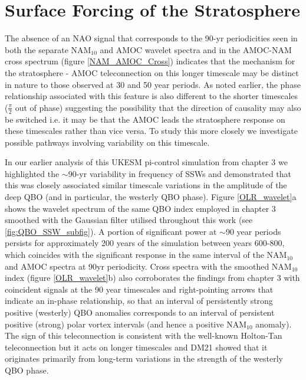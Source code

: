 \section{Surface Forcing of the Stratosphere}\label{surface-strat_forcing}
The absence of an NAO signal that corresponds to the 90-yr periodicities seen in both the separate NAM$_{10}$ and AMOC wavelet spectra and in the  AMOC-NAM cross spectrum (figure \ref{NAM_AMOC_Cross}) indicates that the mechanism for the stratosphere - AMOC teleconnection on this longer timescale may be distinct in nature to those observed at 30 and 50 year periods. As noted earlier, the phase relationship associated with this feature is also different to the shorter timescales ($\frac{\pi}{2}$ out of phase) suggesting the possibility that the direction of causality may also be switched i.e. it may be that the AMOC leads the stratosphere response on these timescales rather than vice versa. To study this more closely we investigate possible pathways involving variability on this timescale.

In our earlier analysis of this UKESM pi-control simulation from chapter 3 we highlighted the $\sim$90-yr variability in frequency of SSWs and demonstrated that this was closely associated similar timescale variations in the amplitude of the deep QBO (and in particular, the westerly QBO phase).  Figure \ref{OLR_wavelet}a shows the wavelet spectrum of the same QBO index employed in chapter 3 smoothed with the Gaussian filter utilised throughout this work (see \ref{fig:QBO_SSW_subfig}). A portion of significant power at $\sim$90 year periods persists for approximately 200 years of the simulation between years 600-800, which coincides with the significant response in the same interval of the NAM$_{10}$ and AMOC spectra at 90yr periodicity. Cross spectra with the smoothed NAM$_{10}$ index (figure \ref{OLR_wavelet}b) also corroborates the findings from chapter 3 with coincident signals at the 90 year timescales and right-pointing arrows that indicate an in-phase relationship, so that an interval of persistently strong positive (westerly) QBO anomalies  corresponds to an interval of persistent positive (strong) polar vortex intervals (and hence a positive NAM$_{10}$ anomaly). The sign of this teleconnection is consistent with the well-known Holton-Tan teleconnection \citep{luDecadalscale2008, luMechanisms2014} but it acts on longer timescales and DM21 showed that it originates primarily from long-term variations in the strength of the westerly QBO phase. 


